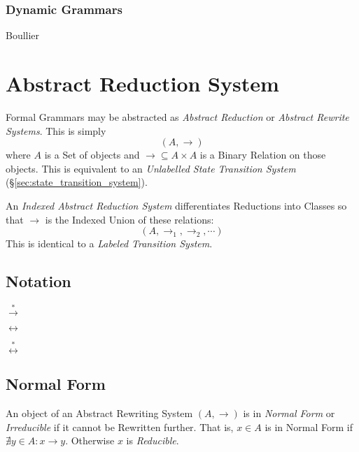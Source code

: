 \subsubsection{Dynamic Grammars}

Boullier\cite{boullier94}



\section{Abstract Reduction System}\label{sec:abstract_rewrite}

Formal Grammars may be abstracted as \emph{Abstract Reduction} or
\emph{Abstract Rewrite Systems}. This is simply
    \[(A,\rightarrow)\]
where $A$ is a Set of objects and $\rightarrow \subseteq A \times A$
is a Binary Relation on those objects. This is equivalent to an
\emph{Unlabelled State Transition System}
(\S\ref{sec:state_transition_system}).

An \emph{Indexed Abstract Reduction System} differentiates Reductions
into Classes so that $\rightarrow$ is the Indexed Union of these
relations:
    \[(A, \rightarrow_1, \rightarrow_2, \cdots)\]
This is identical to a \emph{Labeled Transition System}.



\subsection{Notation}\label{sec:rewrite_notation}

$\stackrel{*}{\rightarrow}$

$\leftrightarrow$

$\stackrel{*}{\leftrightarrow}$



\subsection{Normal Form}\label{sec:normal_form}

An object of an Abstract Rewriting System $(A,\rightarrow)$ is in
\emph{Normal Form} or \emph{Irreducible} if it cannot be Rewritten
further. That is, $x \in A$ is in Normal Form if $\nexists y \in A : x
\rightarrow y$. Otherwise $x$ is \emph{Reducible}.

